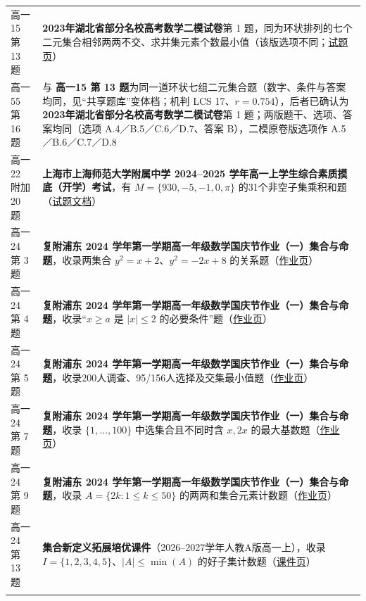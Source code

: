\documentclass[a4paper,11pt]{article}
\begin{document}
\begin{xltabular}{\textwidth}{@{}>{\raggedright\arraybackslash}p{6.55cm}>{\raggedright\arraybackslash}p{8.60cm}@{}}
高一15 第 13 题 & \textbf{2023年湖北省部分名校高考数学二模试卷}第 1 题，同为环状排列的七个二元集合相邻两两不交、求并集元素个数最小值（该版选项不同；\href{https://www.cyfdjjg.com/gzsj/109479.html}{试题页}） \\ \addlinespace[1pt]
高一55 第 16 题 & 与 \textbf{高一15 第 13 题}为同一道环状七组二元集合题（数字、条件与答案均同，见``共享题库''变体档；机判 LCS 17、\(r=\allowbreak 0.754\)），后者已确认为 \textbf{2023年湖北省部分名校高考数学二模试卷}第 1 题；两版题干、选项、答案均同（选项 A.4／B.5／C.6／D.7、答案 B），二模原卷版选项作 A.5／B.6／C.7／D.8 \\ \addlinespace[1pt]
高一22 附加 20 题 & \textbf{上海市上海师范大学附属中学 2024--2025 学年高一上学生综合素质摸底（开学）考试}，有 \(M=\allowbreak \{930,\allowbreak -5,\allowbreak -1,\allowbreak 0,\allowbreak \pi\}\) 的31个非空子集乘积和题（\href{https://m.book118.com/html/2026/0512/8056106102010071.shtm}{试题文档}） \\ \addlinespace[1pt]
高一24 第 3 题 & \textbf{复附浦东 2024 学年第一学期高一年级数学国庆节作业（一）集合与命题}，收录两集合 \(y^2=x+\allowbreak 2\)、\(y^2=\allowbreak -2x+\allowbreak 8\) 的关系题（\href{https://www.zxxk.com/soft/50072683.html}{作业页}） \\ \addlinespace[1pt]
高一24 第 4 题 & \textbf{复附浦东 2024 学年第一学期高一年级数学国庆节作业（一）集合与命题}，收录``\(x\geqslant\allowbreak  a\) 是 \(\lvert x\rvert\leqslant\allowbreak 2\) 的必要条件''题（\href{https://www.zxxk.com/soft/50072683.html}{作业页}） \\ \addlinespace[1pt]
高一24 第 5 题 & \textbf{复附浦东 2024 学年第一学期高一年级数学国庆节作业（一）集合与命题}，收录200人调查、95/156人选择及交集最小值题（\href{https://www.zxxk.com/soft/50072683.html}{作业页}） \\ \addlinespace[1pt]
高一24 第 7 题 & \textbf{复附浦东 2024 学年第一学期高一年级数学国庆节作业（一）集合与命题}，收录 \(\{1,\allowbreak \ldots,\allowbreak 100\}\) 中选集合且不同时含 \(x,\allowbreak 2x\) 的最大基数题（\href{https://www.zxxk.com/soft/50072683.html}{作业页}） \\ \addlinespace[1pt]
高一24 第 9 题 & \textbf{复附浦东 2024 学年第一学期高一年级数学国庆节作业（一）集合与命题}，收录 \(A=\allowbreak \{2k:1\leqslant\allowbreak  k\leqslant\allowbreak 50\}\) 的两两和集合元素计数题（\href{https://www.zxxk.com/soft/50072683.html}{作业页}） \\ \addlinespace[1pt]
高一24 第 13 题 & \textbf{集合新定义拓展培优课件}（2026--2027学年人教A版高一上），收录 \(I=\allowbreak \{1,\allowbreak 2,\allowbreak 3,\allowbreak 4,\allowbreak 5\}\)、\(\lvert A\rvert\leqslant\allowbreak \min(A)\) 的好子集计数题（\href{https://www.zxxk.com/soft/59046561.html}{课件页}） \\ \addlinespace[1pt]

\end{xltabular}
\end{document}
